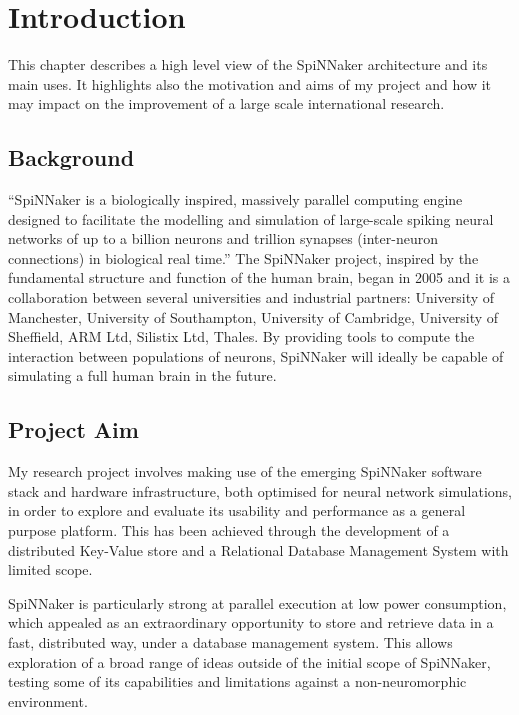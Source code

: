 \chapter{Introduction}
\label{cha:intro}

This chapter describes a high level view of the SpiNNaker architecture and its main uses. It highlights also the motivation and aims of my project and how it may impact on the improvement of a large scale international research.

\section{Background}
\label{sec:background}

“SpiNNaker is a biologically inspired, massively parallel computing engine designed to facilitate the modelling and simulation of large-scale spiking neural networks of up to a billion neurons and trillion synapses (inter-neuron connections) in biological real time.” \cite{painkras} The SpiNNaker project, inspired by the fundamental structure and function of the human brain, began in 2005 and it is a collaboration between several universities and industrial partners: University of Manchester, University of Southampton, University of Cambridge, University of Sheffield, ARM Ltd, Silistix Ltd, Thales. \cite{spinnproject} By providing tools to compute the interaction between populations of neurons, SpiNNaker will ideally be capable of simulating a full human brain in the future.

\section{Project Aim}
\label{sec:aim}

My research project involves making use of the emerging SpiNNaker software stack and hardware infrastructure, both optimised for neural network simulations, in order to explore and evaluate its usability and performance as a general purpose platform. This has been achieved through the development of a distributed Key-Value store and a Relational Database Management System with limited scope.

SpiNNaker is particularly strong at parallel execution at low power consumption, which appealed as an extraordinary opportunity to store and retrieve data in a fast, distributed way, under a database management system. This allows exploration of a broad range of ideas outside of the initial scope of SpiNNaker, testing some of its capabilities and limitations against a non-neuromorphic environment.

